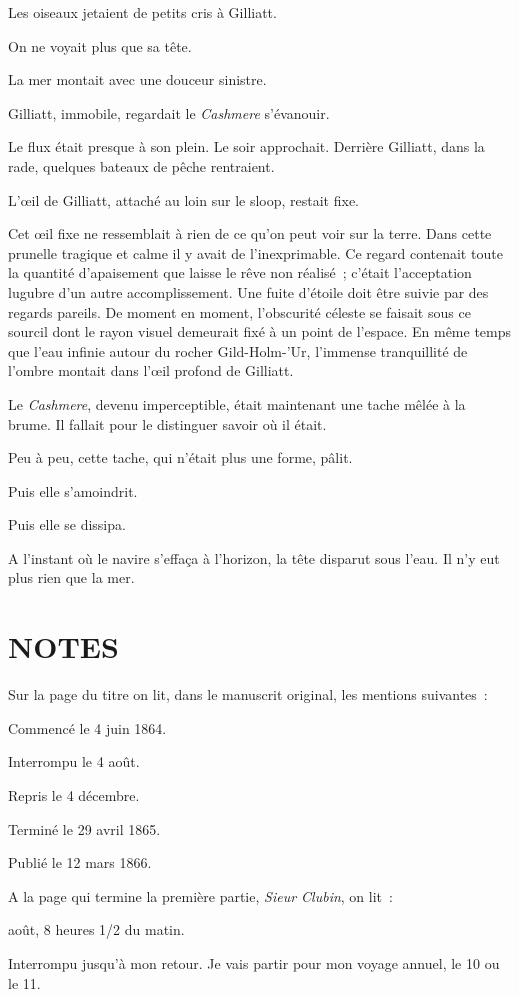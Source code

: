 \documentclass[french,twoside]{book} %
\def\mednobreak{\ifdim\lastskip<\medskipamount
  \removelastskip\nopagebreak\medskip\fi}
\newcommand{\labelblock}[1]{\medbreak{\noindent\color{rubric}\bfseries #1}\par\mednobreak}
\begin{document}
Les oiseaux jetaient de petits cris à Gilliatt.\par
On ne voyait plus que sa tête.\par
La mer montait avec une douceur sinistre.\par
Gilliatt, immobile, regardait le \emph{Cashmere} s’évanouir.\par
Le flux était presque à son plein. Le soir approchait. Derrière Gilliatt, dans la rade, quelques bateaux de pêche rentraient.\par
L’œil de Gilliatt, attaché au loin sur le sloop, restait fixe.\par
Cet œil fixe ne ressemblait à rien de ce qu’on peut voir sur la terre. Dans cette prunelle tragique et calme il y avait de l’inexprimable. Ce regard contenait toute la quantité d’apaisement que laisse le rêve non réalisé ; c’était l’acceptation lugubre d’un autre accomplissement. Une fuite d’étoile doit être suivie par des regards pareils. De moment en moment, l’obscurité céleste se faisait sous ce sourcil dont le rayon visuel demeurait fixé à un point de l’espace. En même temps que l’eau infinie autour du rocher Gild-Holm-’Ur, l’immense tranquillité de l’ombre montait dans l’œil profond de Gilliatt.\par
Le \emph{Cashmere}, devenu imperceptible, était maintenant une tache mêlée à la brume. Il fallait pour le distinguer savoir où il était.\par
 Peu à peu, cette tache, qui n’était plus une forme, pâlit.\par
Puis elle s’amoindrit.\par
Puis elle se dissipa.\par
A l’instant où le navire s’effaça à l’horizon, la tête disparut sous l’eau. Il n’y eut plus rien que la mer.
 \section[{NOTES}]{NOTES}\renewcommand{\leftmark}{NOTES}

  
\labelblock{NOTE I.}

\noindent Sur la page du titre on lit, dans le manuscrit original, les mentions suivantes :\par
\bigbreak
\noindent Commencé le 4 juin 1864.\par
Interrompu le 4 août.\par
Repris le 4 décembre.\par
Terminé le 29 avril 1865.\par
Publié le 12 mars 1866.\par
\bigbreak
\noindent A la page qui termine la première partie, \emph{Sieur Clubin}, on lit :\par
\bigbreak
{} août, 8 heures 1/2 du matin.\par
Interrompu jusqu’à mon retour. Je vais partir pour mon voyage annuel, le 10 ou le 11.\par
 
\end{document}
